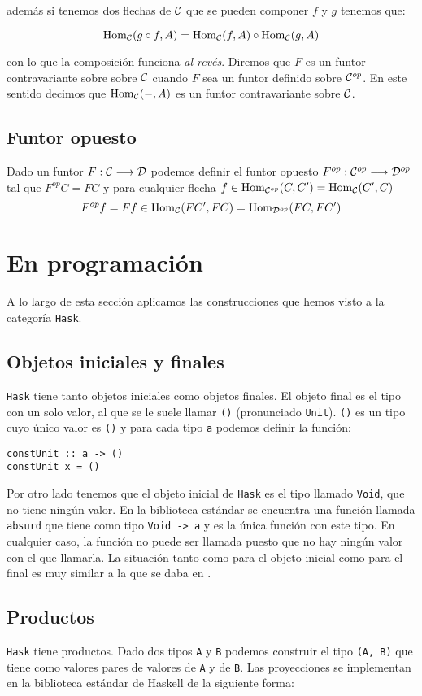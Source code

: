 además si tenemos dos flechas de $\mathcal{C}$ que se pueden componer
$f$ y $g$ tenemos que:

$$\operatorname{Hom}_{\mathcal{C}}(g \circ f, A) = \operatorname{Hom}_{\mathcal{C}}(f, A) \circ \operatorname{Hom}_{\mathcal{C}}(g, A)$$

con lo que la composición funciona \textit{al revés}. Diremos que
$F$ es un funtor contravariante sobre sobre $\mathcal{C}$ cuando $F$ sea
un funtor definido sobre $\mathcal{C}^{op}$. En este sentido
decimos que $\operatorname{Hom}_{\mathcal{C}}(-, A)$ es un funtor contravariante
sobre $\mathcal{C}$.

\subsection{Funtor opuesto}
Dado un funtor $F : \mathcal{C}\longrightarrow \mathcal{D}$ podemos definir el funtor opuesto
$F^{op} : \mathcal{C}^{op}\longrightarrow \mathcal{D}^{op}$ tal que $F^{op}C = FC$ y para cualquier
flecha $f \in \operatorname{Hom}_{\mathcal{C}^{op}}(C, C') = \operatorname{Hom}_{\mathcal{C}}(C', C)$
$$F^{op}f = F f \in \operatorname{Hom}_{\mathcal{C}}(FC', FC) = \operatorname{Hom}_{\mathcal{D}^{op}}(FC, FC')$$

\section{En programación}
A lo largo de esta sección aplicamos las construcciones que hemos visto
a la categoría \texttt{Hask}.

\subsection{Objetos iniciales y finales}
\texttt{Hask} tiene tanto objetos iniciales como objetos finales. El
objeto final es el tipo con un solo valor, al que se le suele llamar
\texttt{()} (pronunciado \texttt{Unit}). \texttt{()} es un tipo
cuyo único valor es \texttt{()} y para cada tipo \texttt{a} podemos
definir la función:
\begin{verbatim}
constUnit :: a -> ()
constUnit x = ()
\end{verbatim}
Por otro lado tenemos que el objeto inicial de \texttt{Hask} es el tipo
llamado \texttt{Void}, que no tiene ningún valor. En la biblioteca
estándar se encuentra una función llamada \texttt{absurd}
que tiene
como tipo \texttt{Void -> a} y es la única función con este tipo.
En cualquier caso, la función no puede ser llamada puesto que no
hay ningún valor con el que llamarla. La situación tanto como para
el objeto inicial como para el final es muy similar a la que se daba
en \Set.

\subsection{Productos}
\texttt{Hask} tiene productos. Dado dos tipos \texttt{A} y
\texttt{B} podemos construir el tipo \texttt{(A, B)} que tiene
como valores pares de valores de \texttt{A} y de \texttt{B}.
Las proyecciones se implementan en la biblioteca estándar de
Haskell de la siguiente forma:

